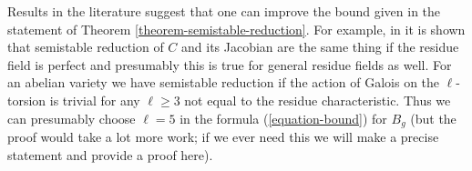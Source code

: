 \begin{remark}
\label{remark-improving-bound}
Results in the literature suggest that one can improve the bound
given in the statement of Theorem \ref{theorem-semistable-reduction}.
For example, in \cite{DM} it is shown that semistable reduction
of $C$ and its Jacobian are the same thing if the residue field is perfect
and presumably this is true for general residue fields as well.
For an abelian variety we have semistable reduction if the action of Galois
on the $\ell$-torsion is trivial for any $\ell \geq 3$ not equal to the
residue characteristic. Thus we can presumably choose $\ell = 5$
in the formula (\ref{equation-bound}) for $B_g$
(but the proof would take a lot more work; if we ever need this
we will make a precise statement and provide a proof here).
\end{remark}










